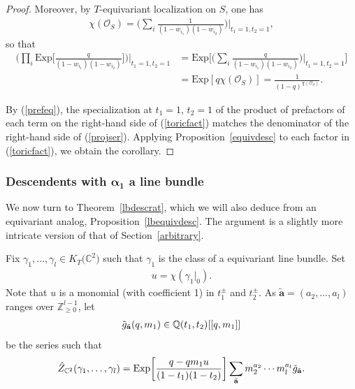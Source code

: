 \documentclass[10pt,a4paper]{amsart}
\numberwithin{equation}{section}
\newcommand{\Exp}{\mathrm{Exp}}
\def\O{\mathcal{O}}
\def\C{\mathbb C}
\def\Q{\mathbb Q}
\def\Z{\mathbb Z}
\begin{document}
\begin{proof}
Moreover, by $T$-equivariant localization on $S$, one has
\begin{gather*}
\chi(\O_{S})=\bigg(\sum_{i} \frac{1}{(1-w_{i_1})(1-w_{i_2})}\bigg)\bigg |_{t_1=1,t_2=1},
\end{gather*}
so that
\begin{align}\nonumber
\bigg(\prod_{i} \Exp\bigg [\frac{q}{(1-w_{i_1})(1-w_{i_2})}\bigg ] \bigg)\bigg |_{t_1=1,t_2=1}&=\Exp\bigg[\bigg(\sum_{i} \frac{q}{(1-w_{i_1})(1-w_{i_2})}\bigg)\bigg |_{t_1=1,t_2=1}\bigg]\nonumber
\\
&=\Exp[q\chi(\O_S)]=\frac{1}{(1-q)^{\chi(\O_S)}}.
\label{prefeq}
\end{align}

By (\ref{prefeq}), the specialization at $t_1=1$, $t_2=1$ of the product of prefactors of each term on the right-hand side of (\ref{toricfact}) matches the denominator of the right-hand side of (\ref{projser}). Applying Proposition~\ref{equivdesc} to each factor in (\ref{toricfact}), we obtain the corollary. \end{proof}

\subsubsection[Descendents with alpha\_1 a line bundle]{Descendents with $\boldsymbol{\alpha_1}$ a line bundle}

We now turn to Theorem~\ref{lbdescrat}, which we will also deduce from an equivariant analog, Proposition~\ref{lbequivdesc}. The argument is a slightly more intricate version of that of Section~\ref{arbitrary}.

Fix $\gamma_1,\dots,\gamma_l\in K_T\big(\C^2\big)$ such that $\gamma_1$ is the class of a equivariant line bundle. Set
\begin{gather*}
u=\chi(\gamma_1|_0).
\end{gather*}
Note that $u$ is a monomial (with coefficient 1) in $t_1^{\pm}$ and $t_2^{\pm}$. As $\tilde{\mathbf{a}}=(a_2,\dots,a_l)$ ranges over $\Z_{\geq 0}^{l-1}$, let
\begin{gather*}
\tilde{g}_{\tilde{\bf{a}}}(q,m_1)\in \Q(t_1,t_2)[[q,m_1]]
\end{gather*}
be the series such that
\begin{align}\label{gtildedef}
\hat{Z}_{\C^2}(\gamma_1,\dots,\gamma_l)=\Exp\bigg[\frac{q-qm_1u}{(1-t_1)(1-t_2)}\bigg]
\sum_{\tilde{\bf{a}}} m_2^{a_2}\cdots m_l^{a_l}\tilde{g}_{\tilde{\bf{a}}}.
\end{align}
\end{document}
